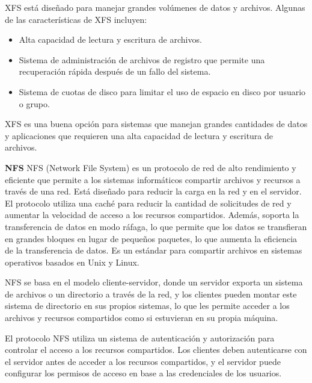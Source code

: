 \begin{doublespace}
\begin{multicols}{2}
    XFS está diseñado para manejar grandes volúmenes de datos y archivos. Algunas de las características de XFS incluyen:

    \begin{itemize}
        \item Alta capacidad de lectura y escritura de archivos.
        \item Sistema de administración de archivos de registro que permite una recuperación rápida después de un fallo del sistema.
        \item Sistema de cuotas de disco para limitar el uso de espacio en disco por usuario o grupo.
    \end{itemize}

    XFS es una buena opción para sistemas que manejan grandes cantidades de datos y aplicaciones que requieren una alta capacidad de lectura y escritura de archivos. \cite{RHEL-XFS-1}

    \textbf{NFS}
    \newline
    NFS (Network File System) es un protocolo de red de alto rendimiento y eficiente que permite a los sistemas informáticos compartir archivos y recursos a través de una red. Está diseñado para reducir la carga en la red y en el servidor. El protocolo utiliza una caché para reducir la cantidad de solicitudes de red y aumentar la velocidad de acceso a los recursos compartidos. Además, soporta la transferencia de datos en modo ráfaga, lo que permite que los datos se transfieran en grandes bloques en lugar de pequeños paquetes, lo que aumenta la eficiencia de la transferencia de datos. Es un estándar para compartir archivos en sistemas operativos basados en Unix y Linux.

    NFS se basa en el modelo cliente-servidor, donde un servidor exporta un sistema de archivos o un directorio a través de la red, y los clientes pueden montar este sistema de directorio en sus propios sistemas, lo que les permite acceder a los archivos y recursos compartidos como si estuvieran en su propia máquina.

    El protocolo NFS utiliza un sistema de autenticación y autorización para controlar el acceso a los recursos compartidos. Los clientes deben autenticarse con el servidor antes de acceder a los recursos compartidos, y el servidor puede configurar los permisos de acceso en base a las credenciales de los usuarios. \cite{RHEL-NFS-1} \cite{RHEL-NFS-2}


\end{multicols}
\end{doublespace}

